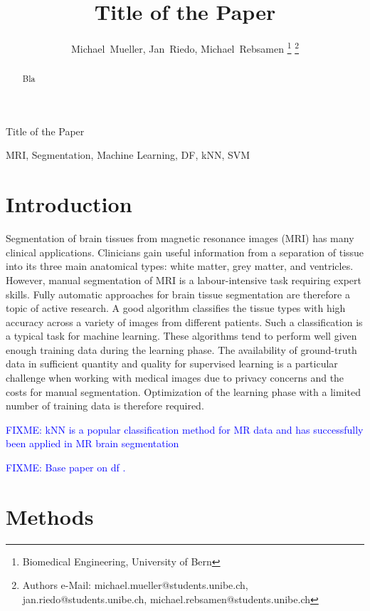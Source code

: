 \documentclass[journal]{IEEEtran}
\newcommand\FIXME[1]{\textcolor{blue}{FIXME: #1}}
\begin{document}
\title{Title of the Paper}


\author{Michael~Mueller,
        Jan~Riedo,
        Michael~Rebsamen%
\thanks{Biomedical Engineering, University of Bern}%
\thanks{Authors e-Mail: michael.mueller@students.unibe.ch, jan.riedo@students.unibe.ch, michael.rebsamen@students.unibe.ch}}%
%
{Title of the Paper}
\maketitle

\begin{abstract}
Bla
\end{abstract}
\begin{IEEEkeywords}
MRI, Segmentation, Machine Learning, DF, kNN, SVM
\end{IEEEkeywords}


\section{Introduction}
Segmentation of brain tissues from magnetic resonance images (MRI) has many clinical applications. Clinicians gain useful information from a separation of tissue into its three main anatomical types: white matter, grey matter, and ventricles. However, manual segmentation of MRI is a labour-intensive task requiring expert skills. Fully automatic approaches for brain tissue segmentation are therefore a topic of active research. A good algorithm classifies the tissue types with high accuracy across a variety of images from different patients. Such a classification is a typical task for machine learning. These algorithms tend to perform well given enough training data during the learning phase. The availability of ground-truth data in sufficient quantity and quality for supervised learning is a particular challenge when working with medical images due to privacy concerns and the costs for manual segmentation. Optimization of the learning phase with a limited number of training data is therefore required.

\FIXME{kNN is a popular classification method for MR data and has successfully been applied in MR brain segmentation\cite{Anbeek2004,Cocosco2003,Warfield2000}}

\FIXME{Base paper on df \cite{Breiman2001}.}


\section{Methods}
\end{document}
